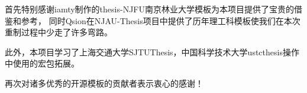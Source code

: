 首先特别感谢iamty制作的thesis-NJFU南京林业大学模板为本项目提供了宝贵的借鉴和参考，
同时Qsion在NJAU-Thesis项目中提供了历年理工科模板使我们在本次重制过程中少走了许多弯路。

此外，本项目学习了上海交通大学SJTUThesis，中国科学技术大学ustcthesis操作中使用的宏包拓展。

再次对诸多优秀的开源模板的贡献者表示衷心的感谢！